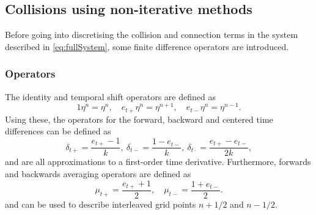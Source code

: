\documentclass[dvipsnames, pdftex]{article}
\begin{document}
\subsection{Collisions using non-iterative methods}
Before going into discretising the collision and connection terms in the system described in \eqref{eq:fullSystem}, some finite difference operators are introduced.
\subsubsection{Operators}
The identity and temporal shift operators are defined as
\begin{equation}
    1\eta^n = \eta^n, \quad e_{t+}\eta^n = \eta^{n+1}, \quad e_{t-}\eta^n = \eta^{n-1}.
\end{equation}
Using these, the operators for the forward, backward and centered time differences can be defined as
\begin{equation}\label{eq:discTimeOperators}
    \delta_{t+} = \frac{e_{t+} - 1}{k},\ \delta_{t-} = \frac{1 - e_{t-}}{k},\ \delta_{t\cdot} = \frac{e_{t+}-e_{t-}}{2k},
\end{equation}
and are all approximations to a first-order time derivative. Furthermore, forwards and backwards averaging operators are defined as
\begin{equation}
    \mu_{t+} = \frac{e_{t+} + 1}{2}, \quad \mu_{t-} = \frac{1 + e_{t-}}{2}.
\end{equation}
and can be used to describe interleaved grid points $n+1/2$ and $n-1/2$.
\end{document}

